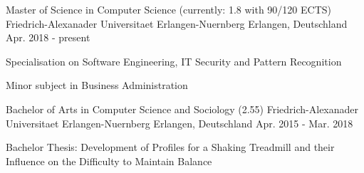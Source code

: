 

\begin{cventries}

  \cventry
    {Master of Science in Computer Science (currently: 1.8 with 90/120 ECTS)} %
    {Friedrich-Alexanader Universitaet Erlangen-Nuernberg} %
    {Erlangen, Deutschland} %
    {Apr. 2018 - present} %
    {
      \begin{cvitems} %
        \item {Specialisation on Software Engineering, IT Security and Pattern Recognition}
        \item {Minor subject in Business Administration}
      \end{cvitems}
    }
    
    \cventry
    {Bachelor of Arts in Computer Science and Sociology (2.55)} %
    {Friedrich-Alexanader Universitaet Erlangen-Nuernberg} %
    {Erlangen, Deutschland} %
    {Apr. 2015 - Mar. 2018} %
    {
      \begin{cvitems} %
        \item {Bachelor Thesis: Development of Profiles for a Shaking Treadmill and their Influence on the Difficulty to Maintain Balance}
      \end{cvitems}
    }

\end{cventries}

